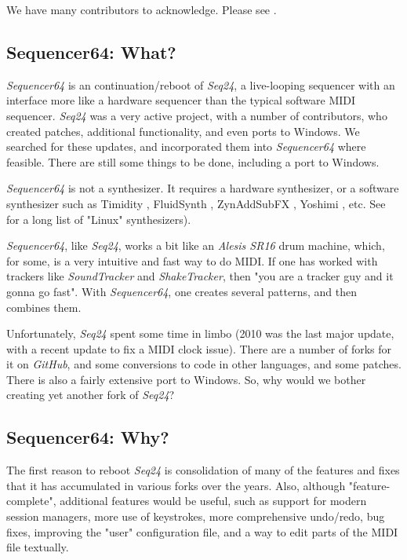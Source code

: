 \documentclass[
 11pt,
 twoside,
 a4paper,
 headinclude,
 footinclude,
 final                                 %
]{article}
\begin{document}
   We have many contributors to acknowledge.  Please see
   .

\subsection{Sequencer64: What?}
\label{subsec:what_is_sequencer64}

   \textsl{Sequencer64} is an continuation/reboot of \textsl{Seq24},
   a live-looping sequencer with an interface more like a hardware sequencer
   than the typical software MIDI sequencer.
   \textsl{Seq24} was a very active project, with a
   number of contributors, who created patches, additional
   functionality, and even ports to Windows.
   We searched for these updates, and
   incorporated them into \textsl{Sequencer64} where feasible.
   There are still some things to be done, including a port to
   Windows.

   \textsl{Sequencer64} is not a synthesizer.  It requires a hardware
   synthesizer, or a software synthesizer such as Timidity \cite{timidity},
   FluidSynth \cite{fluidsynth}, ZynAddSubFX \cite{zynaddsubfx}, Yoshimi
   \cite{yoshimi} \cite{yoshimi2}, etc.
   See \cite{linuxsynths} for a long list of "Linux" synthesizers).

   \textsl{Sequencer64}, like \textsl{Seq24},
   works a bit like an \textsl{Alesis SR16} drum machine,
   which, for some, is a very intuitive and fast way to do MIDI.
   If one has worked with trackers like \textsl{SoundTracker} and
   \textsl{ShakeTracker}, then "you are a tracker guy and it gonna go fast".
   With \textsl{Sequencer64}, one creates several patterns, and then
   combines them.

   Unfortunately, \textsl{Seq24} spent some time in limbo
   (2010 was the last major update, with a
   recent update to fix a MIDI clock issue).  There are a number of
   forks for it on \textsl{GitHub}, and some conversions
   to code in other languages, and some patches.
   There is also a fairly extensive port to Windows.
   So, why would we bother creating yet another fork of \textsl{Seq24}?

\subsection{Sequencer64: Why?}
\label{subsec:introduction_seq64_vs_others}

   The first reason to reboot \textsl{Seq24} is consolidation of many of the
   features and fixes that it has accumulated in various forks over the years.
   Also, although "feature-complete", additional features would be useful, such
   as support for modern session managers, more use of keystrokes,
   more comprehensive undo/redo,
   bug fixes, improving the "user" configuration file,
   and a way to edit parts of the MIDI file textually.
\end{document}

